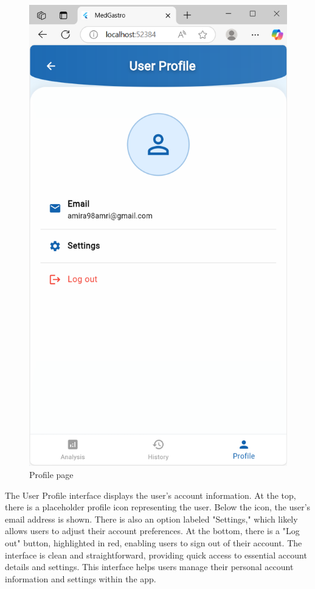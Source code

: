\documentclass[12pt,a4paper]{report}
\begin{document}
\begin{figure}[H]
    \centering
    \includegraphics[width=0.5\linewidth]{i6.png}
    \caption{Profile page}
    \label{fig:enter-label}
\end{figure}

The User Profile interface displays the user's account information. At the top, there is a placeholder profile icon representing the user. Below the icon, the user's email address is shown. There is also an option labeled "Settings," which likely allows users to adjust their account preferences. At the bottom, there is a "Log out" button, highlighted in red, enabling users to sign out of their account. The interface is clean and straightforward, providing quick access to essential account details and settings. This interface helps users manage their personal account information and settings within the app.
\end{document}
